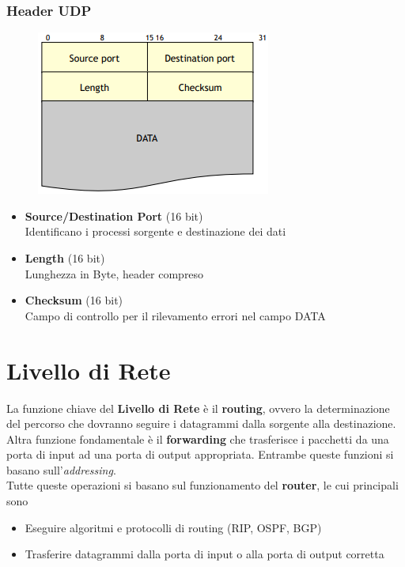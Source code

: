 \documentclass{article}
\begin{document}
            \subsubsection{Header UDP}
                \begin{figure}[H]
                    \centering
                    \includegraphics[width=\textwidth]{pic/header_udp.png}
                    \label{Header UDP}
                \end{figure}
                \begin{itemize}
                    \item \textbf{Source/Destination Port} (16 bit)\\
                          Identificano i processi sorgente e destinazione dei dati
                    \item \textbf{Length} (16 bit)\\
                          Lunghezza in Byte, header compreso
                    \item \textbf{Checksum} (16 bit)\\
                          Campo di controllo per il rilevamento errori nel campo DATA
                \end{itemize}

\newpage                
    \section{Livello di Rete}
        La funzione chiave del \textbf{Livello di Rete} è il \textbf{routing}, ovvero la determinazione del percorso che dovranno seguire i datagrammi dalla sorgente alla destinazione. Altra funzione fondamentale è il \textbf{forwarding} che trasferisce i pacchetti da una porta di input ad una porta di output appropriata. Entrambe queste funzioni si basano sull'\textit{addressing}.\\
        Tutte queste operazioni si basano sul funzionamento del \textbf{router}, le cui principali sono
        \begin{itemize}
            \item Eseguire algoritmi e protocolli di routing (RIP, OSPF, BGP)
            \item Trasferire datagrammi dalla porta di input o alla porta di output corretta
        \end{itemize}
\end{document}
